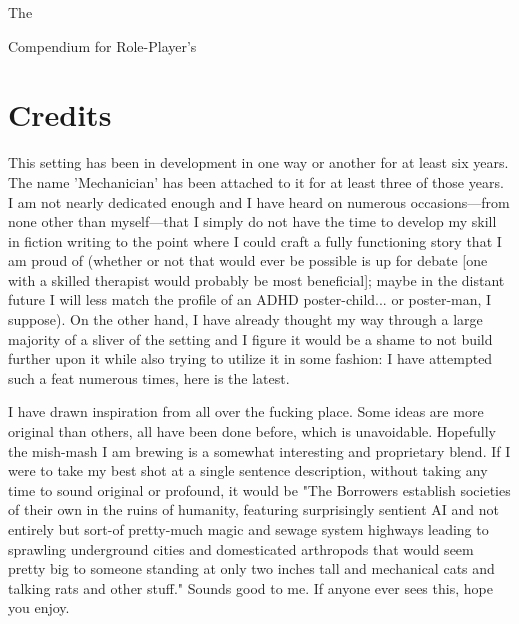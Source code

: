 \documentclass[twoside, 12pt, letterpaper]{report}\usepackage[]{graphicx}\usepackage[]{color}
\begin{document}
\newcommand{\spoiler}[1]{\textcolor{purple}{#1 }}
\newcommand{\fourthwall}[1]{#1 }



\begin{center}
\begin{framed}
\Huge{The}

\Huge{\nmw}

\Huge{Compendium for Role-Player's}

\end{framed}
\end{center}
\newpage

\chapter*{Credits}

\newpage

\tableofcontents

\newpage
{}
This setting has been in development in one way or another for at least six years. The name 'Mechanician' has been attached to it for at least three of those years. I am not nearly dedicated enough and I have heard on numerous occasions---from none other than myself---that I simply do not have the time to develop my skill in fiction writing to the point where I could craft a fully functioning story that I am proud of (whether or not that would ever be possible is up for debate [one with a skilled therapist would probably be most beneficial]; maybe in the distant future I will less match the profile of an ADHD poster-child... or poster-man, I suppose). On the other hand, I have already thought my way through a large majority of a sliver of the \mw setting and I figure it would be a shame to not build further upon it while also trying to utilize it in some fashion: I have attempted such a feat numerous times, here is the latest.

I have drawn inspiration from all over the fucking place. Some ideas are more original than others, all have been done before, which is unavoidable. Hopefully the mish-mash I am brewing is a somewhat interesting and proprietary blend. If I were to take my best shot at a single sentence description, without taking any time to sound original or profound, it would be "The Borrowers establish societies of their own in the ruins of humanity, featuring surprisingly sentient AI and not entirely but sort-of pretty-much magic and sewage system highways leading to sprawling underground cities and domesticated arthropods that would seem pretty big to someone standing at only two inches tall and mechanical cats and talking rats and other stuff." Sounds good to me. If anyone ever sees this, hope you enjoy.
\end{document}
